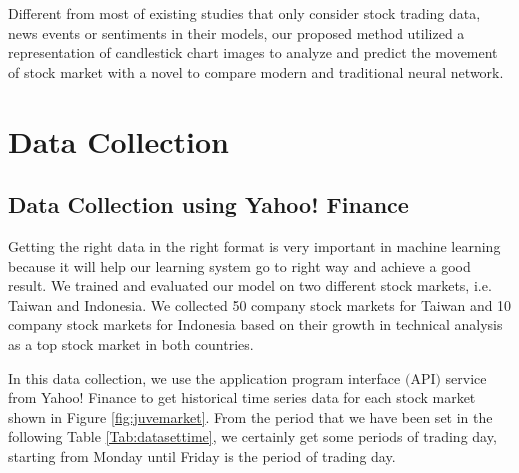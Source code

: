 \documentclass[10pt,twocolumn]{article}
\begin{document}
\par
Different from most of existing studies that only consider stock trading data, news events or sentiments in their models, our proposed method utilized a representation of candlestick chart images to analyze and predict the movement of stock market with a novel to compare modern and traditional neural network. 


\section{Data Collection}
\subsection{Data Collection using Yahoo! Finance}
Getting the right data in the right format is very important in machine learning because it will help our learning system go to right way and achieve a good result. We trained and evaluated our model on two different stock markets, i.e. Taiwan and Indonesia. We collected 50 company stock markets for Taiwan and 10 company stock markets for Indonesia based on their growth in technical analysis as a top stock market in both countries.
\par
In this data collection, we use the application program interface $($API$)$ service from Yahoo! Finance to get historical time series data for each stock market shown in Figure \ref{fig:juvemarket}. From the period that we have been set in the following Table \ref{Tab:datasettime}, we certainly get some periods of trading day, starting from Monday until Friday is the period of trading day.

\begin{table}[]
\caption{The period time of our dataset, separated between the training, testing and independent data.}
\label{Tab:datasettime}
\end{table}
\end{document}
